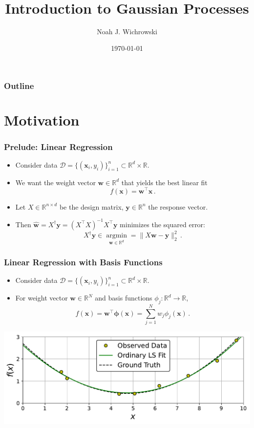 \documentclass{beamer}
\title{Introduction to Gaussian Processes}
\author{Noah J. Wichrowski}
\institute[JHU]{Johns Hopkins University}
\date{\today}
\newcommand{\R}{\mathbb{R}}
\newcommand{\vect}[1]{\boldsymbol{#1}}
\newcommand{\argminn}{\mathop{\mathrm{argmin}}\limits}
\providecommand{\norm}[1]{\lVert#1\rVert}
\begin{document}
	\begin{frame}
		\titlepage
	\end{frame}
	
	\begin{frame}
		\frametitle{Outline}
		\tableofcontents
	\end{frame}
	
	\section{Motivation}
	\begin{frame}
		\frametitle{Prelude: Linear Regression}
		\begin{itemize}
			\item Consider data $\mathcal{D}=\{(\vect{x}_i,y_i)\}_{i=1}^n\subset\R^d\times\R$.
			\item We want the weight vector $\vect{w}\in\R^d$ that yields the best linear fit $$f(\vect{x})=\vect{w}^\top\vect{x}\,.$$
			\item Let $X\in\R^{n\times d}$ be the design matrix, $\vect{y}\in\R^n$ the response vector.
			\item Then $\vect{\widehat{w}}=X^\dagger\vect{y}=(X^\top X)^{-1}X^\top\vect{y}$ minimizes the squared error: $$X^\dagger\vect{y}\in\argminn_{\vect{w}\in\R^d}=\norm{X\vect{w}-\vect{y}}_2^2\,.$$
		\end{itemize}
	\end{frame}

	\begin{frame}
		\frametitle{Linear Regression with Basis Functions}
		\begin{itemize}
			\item Consider data $\mathcal{D}=\{(\vect{x}_i,y_i)\}_{i=1}^n\subset\R^d\times\R$.
			\item For weight vector $\vect{w}\in\R^N$ and basis functions $\phi_j:\R^d\to\R$, $$f(\vect{x})=\vect{w}^\top\vect{\phi}(\vect{x})=\sum_{j=1}^Nw_j\phi_j(\vect{x})\,.$$
		\end{itemize}
		
		\begin{center}
			\includegraphics[scale=0.5]{figures/01b_ordinary_least_squares_wTrue.pdf}
		\end{center}
	\end{frame}
	
\end{document}
